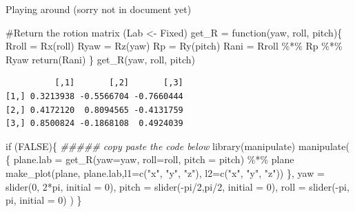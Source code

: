 \documentclass[
  letterpaper,
  DIV=11,
  numbers=noendperiod]{scrartcl}
\newenvironment{Shaded}{\begin{snugshade}}{\end{snugshade}}
\newcommand{\AttributeTok}[1]{\textcolor[rgb]{0.40,0.45,0.13}{#1}}
\newcommand{\CommentTok}[1]{\textcolor[rgb]{0.37,0.37,0.37}{#1}}
\newcommand{\ConstantTok}[1]{\textcolor[rgb]{0.56,0.35,0.01}{#1}}
\newcommand{\ControlFlowTok}[1]{\textcolor[rgb]{0.00,0.23,0.31}{#1}}
\newcommand{\DecValTok}[1]{\textcolor[rgb]{0.68,0.00,0.00}{#1}}
\newcommand{\DocumentationTok}[1]{\textcolor[rgb]{0.37,0.37,0.37}{\textit{#1}}}
\newcommand{\FunctionTok}[1]{\textcolor[rgb]{0.28,0.35,0.67}{#1}}
\newcommand{\NormalTok}[1]{\textcolor[rgb]{0.00,0.23,0.31}{#1}}
\newcommand{\OtherTok}[1]{\textcolor[rgb]{0.00,0.23,0.31}{#1}}
\newcommand{\SpecialCharTok}[1]{\textcolor[rgb]{0.37,0.37,0.37}{#1}}
\newcommand{\StringTok}[1]{\textcolor[rgb]{0.13,0.47,0.30}{#1}}
\begin{document}
Playing around (sorry not in document yet)

\begin{Shaded}
\begin{Highlighting}[]
\CommentTok{\#Return the rotion matrix (Lab  \textless{}{-} Fixed)}
\NormalTok{get\_R }\OtherTok{=} \ControlFlowTok{function}\NormalTok{(yaw, roll, pitch)\{}
\NormalTok{   Rroll }\OtherTok{=} \FunctionTok{Rx}\NormalTok{(roll)}
\NormalTok{   Ryaw  }\OtherTok{=} \FunctionTok{Rz}\NormalTok{(yaw)}
\NormalTok{   Rp }\OtherTok{=} \FunctionTok{Ry}\NormalTok{(pitch) }
\NormalTok{   Rani }\OtherTok{=}\NormalTok{ Rroll }\SpecialCharTok{\%*\%}\NormalTok{ Rp }\SpecialCharTok{\%*\%}\NormalTok{ Ryaw}
   \FunctionTok{return}\NormalTok{(Rani)}
\NormalTok{\}}
\FunctionTok{get\_R}\NormalTok{(yaw, roll, pitch)}
\end{Highlighting}
\end{Shaded}

\begin{verbatim}
          [,1]       [,2]       [,3]
[1,] 0.3213938 -0.5566704 -0.7660444
[2,] 0.4172120  0.8094565 -0.4131759
[3,] 0.8500824 -0.1868108  0.4924039
\end{verbatim}

\begin{Shaded}
\begin{Highlighting}[]
\ControlFlowTok{if}\NormalTok{ (}\ConstantTok{FALSE}\NormalTok{)\{}
  \DocumentationTok{\#\#\#\#\# copy paste the code below}
  \FunctionTok{library}\NormalTok{(manipulate)}
  \FunctionTok{manipulate}\NormalTok{(}
\NormalTok{    \{}
\NormalTok{      plane.lab }\OtherTok{=} \FunctionTok{get\_R}\NormalTok{(}\AttributeTok{yaw=}\NormalTok{yaw, }\AttributeTok{roll=}\NormalTok{roll, }\AttributeTok{pitch =}\NormalTok{ pitch) }\SpecialCharTok{\%*\%}\NormalTok{ plane}
      \FunctionTok{make\_plot}\NormalTok{(plane, plane.lab,}\AttributeTok{l1=}\FunctionTok{c}\NormalTok{(}\StringTok{"x\textquotesingle{}\textquotesingle{}"}\NormalTok{, }\StringTok{"y\textquotesingle{}\textquotesingle{}"}\NormalTok{, }\StringTok{"z\textquotesingle{}\textquotesingle{}"}\NormalTok{), }\AttributeTok{l2=}\FunctionTok{c}\NormalTok{(}\StringTok{"x\textquotesingle{}\textquotesingle{}\textquotesingle{}"}\NormalTok{, }\StringTok{"y\textquotesingle{}\textquotesingle{}\textquotesingle{}"}\NormalTok{, }\StringTok{"z\textquotesingle{}\textquotesingle{}\textquotesingle{}"}\NormalTok{))}
\NormalTok{    \},}
      \AttributeTok{yaw =} \FunctionTok{slider}\NormalTok{(}\DecValTok{0}\NormalTok{, }\DecValTok{2}\SpecialCharTok{*}\NormalTok{pi, }\AttributeTok{initial =} \DecValTok{0}\NormalTok{),}
      \AttributeTok{pitch =} \FunctionTok{slider}\NormalTok{(}\SpecialCharTok{{-}}\NormalTok{pi}\SpecialCharTok{/}\DecValTok{2}\NormalTok{,pi}\SpecialCharTok{/}\DecValTok{2}\NormalTok{, }\AttributeTok{initial =} \DecValTok{0}\NormalTok{),}
      \AttributeTok{roll =} \FunctionTok{slider}\NormalTok{(}\SpecialCharTok{{-}}\NormalTok{pi, pi, }\AttributeTok{initial =} \DecValTok{0}\NormalTok{)}
\NormalTok{  )}
\NormalTok{\}  }
\end{Highlighting}
\end{Shaded}
\end{document}
